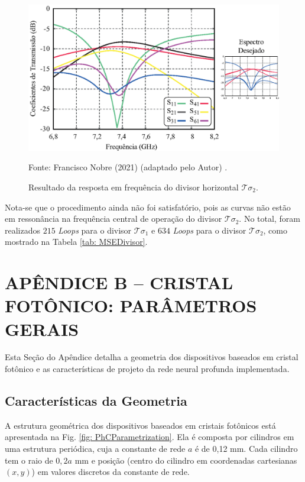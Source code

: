 \begin{figure}[H]
	\centering\includegraphics{04-Figuras/ResultadoHorizontalLoop267.eps}
	\caption{Resultado da resposta em frequência do divisor horizontal $\mathcal{T}\sigma_{2}$.}
    Fonte: Francisco Nobre (2021) (adaptado pelo Autor) \cite{Nobre2021Graphene}.
	\label{fig: ResultadoHorizontalLoop267}
\end{figure}

Nota-se que o procedimento ainda não foi satisfatório, pois as curvas não estão em ressonância na frequência central de operação do divisor $\mathcal{T}\sigma_{2}$. No total, foram realizados $215$ \textit{Loops} para o divisor $\mathcal{T}\sigma_{1}$ e $634$ \textit{Loops} para o divisor $\mathcal{T}\sigma_{2}$, como mostrado na Tabela \ref{tab: MSEDivisor}.




\newpage
\section{APÊNDICE B -- CRISTAL FOTÔNICO: PARÂMETROS GERAIS}      \label{PhC}

Esta Seção do Apêndice detalha a geometria dos dispositivos baseados em cristal fotônico e as características de projeto da rede neural profunda implementada.

\subsection{Características da Geometria}

A estrutura geométrica dos dispositivos baseados em cristais fotônicos está apresentada na Fig. \ref{fig: PhCParametrization}. Ela é composta por cilindros em uma estrutura periódica, cuja a constante de rede $a$ é de 0,12 mm. Cada cilindro tem o raio de $0,2a$ mm e posição (centro do cilindro em coordenadas cartesianas $(x, y)$) em valores discretos da constante de rede.

